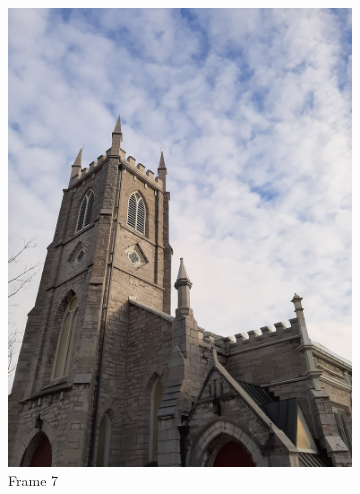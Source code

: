 \documentclass[conference]{IEEEtran}
\begin{document}
\begin{figure}[!h]
\begin{subfigure}[b]{0.2\linewidth}
    \includegraphics[width=\linewidth, angle = -90]{images/frame7.jpg}
    \caption{Frame 7}
    \end{subfigure}
 \begin{subfigure}[b]{0.2\linewidth}

\end{subfigure}
\end{figure}
\end{document}
